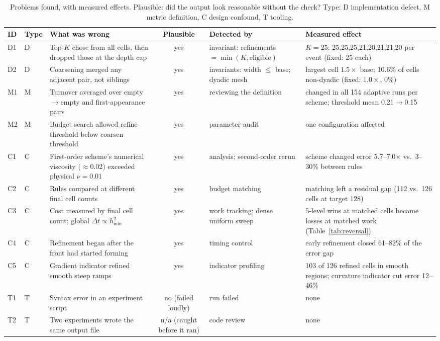 \documentclass[conference]{IEEEtran}
\begin{document}
\begin{table}[t]
\caption{Problems found, with measured effects. Plausible: did the output
look reasonable without the check? Type: D implementation defect, M metric
definition, C design confound, T tooling.}
\label{tab:log}
\centering
\small
\begin{tabular}{@{}l l p{4.3cm} c p{3.1cm} p{4.6cm}@{}}
\toprule
ID & Type & What was wrong & Plausible & Detected by & Measured effect \\
\midrule
D1 & D & Top-$K$ chose from all cells, then dropped those at the depth cap & yes & invariant: refinements $=\min(K,\text{eligible})$ & $K{=}25$: 25,25,25,21,20,21,21,20 per event (fixed: 25 each) \\
D2 & D & Coarsening merged any adjacent pair, not siblings & yes & invariants: width $\le$ base; dyadic mesh & largest cell $1.5\times$ base; 10.6\% of cells non-dyadic (fixed: $1.0\times$, 0\%) \\
M1 & M & Turnover averaged over empty$\to$empty and first-appearance pairs & yes & reviewing the definition & changed in all 154 adaptive runs per scheme; threshold mean 0.21$\to$0.15 \\
M2 & M & Budget search allowed refine threshold below coarsen threshold & yes & parameter audit & one configuration affected \\
C1 & C & First-order scheme's numerical viscosity ($\approx$0.02) exceeded physical $\nu{=}0.01$ & yes & analysis; second-order rerun & scheme changed error 5.7--7.0$\times$ vs.\ 3--30\% between rules \\
C2 & C & Rules compared at different final cell counts & yes & budget matching & matching left a residual gap (112 vs.\ 126 cells at target 128) \\
C3 & C & Cost measured by final cell count; global $\Delta t \propto h_{\min}^2$ & yes & work tracking; dense uniform sweep & 5-level wins at matched cells became losses at matched work (Table~\ref{tab:reversal}) \\
C4 & C & Refinement began after the front had started forming & yes & timing control & early refinement closed 61--82\% of the error gap \\
C5 & C & Gradient indicator refined smooth steep ramps & yes & indicator profiling & 103 of 126 refined cells in smooth regions; curvature indicator cut error 12--46\% \\
T1 & T & Syntax error in an experiment script & no (failed loudly) & run failed & none \\
T2 & T & Two experiments wrote the same output file & n/a (caught before it ran) & code review & none \\
\bottomrule
\end{tabular}
\end{table}
\end{document}
